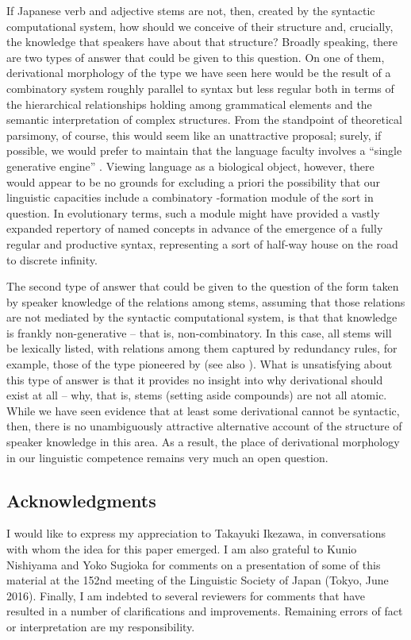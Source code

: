 \documentclass[output=paper,
modfonts
]{LSP/langsci}
\begin{document}
If Japanese verb and adjective stems are not, then, created by the
syntactic computational system, how should we conceive of their
structure and, crucially, the knowledge that speakers have about that
structure? Broadly speaking, there are two types of answer that could be
given to this question. On one of them, derivational morphology of the
type we have seen here would be the result of a combinatory system
roughly parallel to syntax but less regular both in terms of the
hierarchical relationships holding among grammatical elements and the
semantic interpretation of complex structures. From the standpoint of
theoretical parsimony, of course, this would seem like an unattractive
proposal; surely, if possible, we would prefer to maintain that the
language faculty involves a ``single generative engine'' \citep{marantz2001a,marantz2005a}. Viewing language as a biological object, however, there would appear to be no grounds for excluding a priori the possibility that our linguistic capacities include a combinatory -formation module of the sort in question. In evolutionary terms, such a module might have
provided a vastly expanded repertory of named concepts in advance of the
emergence of a fully regular and productive syntax, representing a sort
of half-way house on the road to discrete infinity.

\newpage 
The second type of answer that could be given to the question of the
form taken by speaker knowledge of the relations among  stems,
assuming that those relations are not mediated by the syntactic
computational system, is that that knowledge is frankly
non-generative -- that is, non-combinatory. In this case, all stems will
be lexically listed, with relations among them captured by redundancy
rules, for example, those of the type pioneered by \citet{jackendoff1975a} (see also \citealt[53]{jackendoff2002a}). What is unsatisfying about this type of answer is that it provides no insight into why derivational  should
exist at all -- why, that is, stems (setting aside compounds) are not all
atomic. While we have seen evidence that at least some derivational
 cannot be syntactic, then, there is no unambiguously
attractive alternative account of the structure of speaker knowledge in
this area. As a result, the place of derivational morphology in our
linguistic competence remains very much an open question.

\subsection*{Acknowledgments} I would like to express my appreciation to
Takayuki Ikezawa, in conversations with whom the idea for this paper
emerged. I am also grateful to Kunio Nishiyama and Yoko Sugioka for
comments on a presentation of some of this material at the 152nd meeting
of the Linguistic Society of Japan (Tokyo, June 2016). Finally, I am
indebted to several reviewers for comments that have resulted in a
number of clarifications and improvements. Remaining errors of fact or
interpretation are my responsibility.
\end{document}
